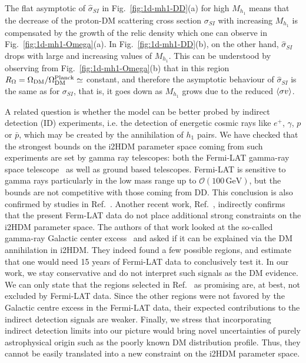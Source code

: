 \documentclass[12pt,a4paper]{article}
\newcommand {\blue} {\color{blue}}
\newcommand{\giac}[2]{{\blue #1 #2}}
\begin{document}
The flat asymptotic of $\hat{\sigma}_{SI}$ in Fig.~\ref{fig:1d-mh1-DD}(a)
for high $M_{h_1}$ means that the decrease of the 
proton-DM scattering cross section ${\sigma}_{SI}$ with increasing $M_{h_1}$ is compensated by the 
growth of the relic density which one can observe in Fig.~\ref{fig:1d-mh1-Omega}(a).
{In Fig.~\ref{fig:1d-mh1-DD}(b), on the other hand, $\hat{\sigma}_{SI}$
drops with large and increasing values of $M_{h_1}$.
This can be understood by observing from Fig.~\ref{fig:1d-mh1-Omega}(b) that in this region
$R_\Omega = \Omega_{\rm DM}/\Omega^{\rm Planck}_{\rm DM}\simeq$ constant, and therefore 
the asymptotic behaviour of $\hat{\sigma}_{SI}$ is the same as for ${\sigma}_{SI}$,
that is, it goes down as $M_{h_1}$ grows due to the reduced $\braket{\sigma v}$.}




A related question is whether the model can be better probed by   indirect detection (ID) experiments, i.e. the detection of   energetic cosmic rays like $e^+$, $\gamma$, $p$ or $\bar{p}$, which may be created by the annihilation of $h_1$ pairs.
We have checked  that the strongest bounds on the i2HDM parameter space
 coming from such experiments are set by gamma ray telescopes: both the Fermi-LAT gamma-ray space telescope~\cite{Ackermann:2011wa} as well as ground based telescopes. Fermi-LAT is sensitive to gamma rays particularly in the low mass range  up to $\mathcal{O}(100\,\mathrm{GeV})$, but the bounds are not competitive with those coming from DD. 
This conclusion is also confirmed by studies in Ref.~\cite{Arhrib:2013ela}.
Another recent work, Ref.~\cite{Eiteneuer:2017hoh}, indirectly confirms that the present Ferm-LAT data do not place additional
strong constraints on the i2HDM parameter space.
The authors of that work looked at the so-called gamma-ray Galactic center excess~\cite{Goodenough:2009gk}
and asked if it can be explained via the DM annihilation in i2HDM.
They indeed found a few possible regions, and estimate that one would need 15 years of Fermi-LAT data 
to conclusively test it. In our work, we stay conservative and do not interpret such signals
as the DM evidence. We can only state that the regions selected in Ref.~\cite{Eiteneuer:2017hoh} as promising are, at best, 
not excluded by Fermi-LAT data. Since the other regions were not favored by the Galactic centre excess in the Fermi-LAT data,
their expected contributions to the indirect detection signals are weaker. 
Finally, we stress that incorporating indirect detection limits into our picture would bring novel uncertainties 
of purely astrophysical origin such as the poorly known DM distribution profile.  
Thus, they cannot be easily translated into a new constraint on the i2HDM parameter space.
\end{document}
